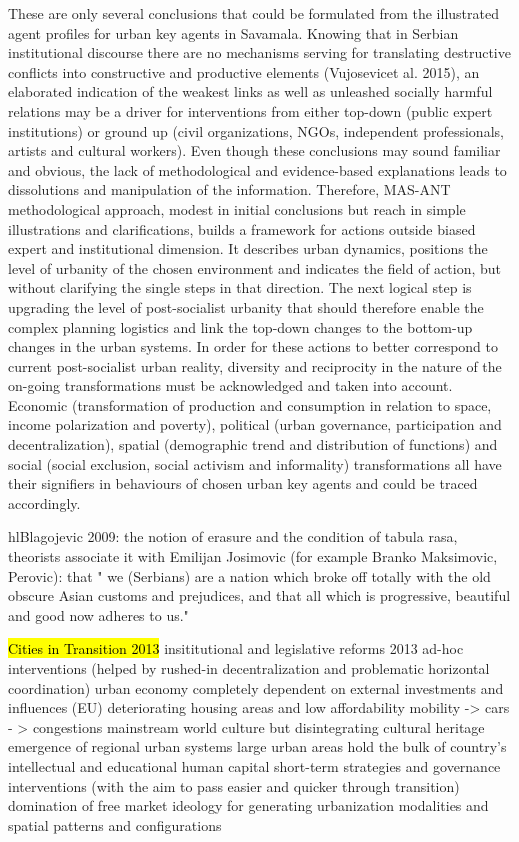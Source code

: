 \documentclass[11pt]{report}
\begin{document}
These are only several conclusions that could be formulated from the illustrated agent profiles for urban key agents in Savamala. Knowing that in Serbian institutional discourse there are no mechanisms serving for translating destructive conflicts into constructive and productive elements (Vujosevicet al. 2015), an elaborated indication of the weakest links as well as unleashed socially harmful relations may be a driver for interventions from either top-down (public expert institutions) or ground up (civil organizations, NGOs, independent professionals, artists and cultural workers). Even though these conclusions may sound familiar and obvious, the lack of methodological and evidence-based explanations leads to dissolutions and manipulation of the information. Therefore, MAS-ANT methodological approach, modest in initial conclusions but reach in simple illustrations and clarifications, builds a framework for actions outside biased expert and institutional dimension. It describes urban dynamics, positions the level of urbanity of the chosen environment and indicates the field of action, but without clarifying the single steps in that direction. The next logical step is upgrading the level of post-socialist urbanity that should therefore enable the complex planning logistics and link the top-down changes to the bottom-up changes in the urban systems. In order for these actions to better correspond to current post-socialist urban reality, diversity and reciprocity in the nature of the on-going transformations must be acknowledged and taken into account. Economic (transformation of production and consumption in relation to space, income polarization and poverty), political (urban governance, participation and decentralization), spatial (demographic trend and distribution of functions) and social (social exclusion, social activism and informality) transformations all have their signifiers in behaviours of chosen urban key agents and could be traced accordingly.

hl{Blagojevic 2009}: 
the notion of erasure and the condition of  tabula rasa, theorists associate it with Emilijan Josimovic (for example Branko Maksimovic, Perovic): that " we (Serbians) are a nation which broke off totally with the old obscure Asian customs and prejudices, and that all which is progressive, beautiful and good now adheres to us."

\hl{Cities in Transition 2013}
insititutional and legislative reforms 2013
    ad-hoc interventions  (helped by rushed-in decentralization and problematic horizontal coordination)
    urban economy completely dependent on external investments and influences (EU)
    deteriorating housing areas and low affordability
    mobility -> cars - > congestions
    mainstream world culture but disintegrating cultural heritage
    emergence of regional urban systems
    large urban areas hold the bulk of country's intellectual and educational human capital
    short-term strategies and governance interventions (with the aim to pass easier and quicker through transition)
    domination of free market ideology for generating urbanization modalities and spatial patterns and configurations
    
\end{document}
